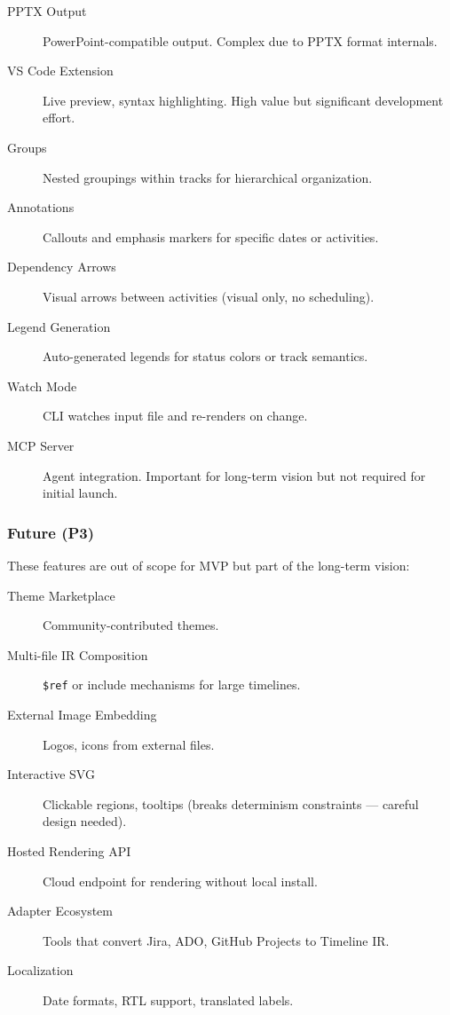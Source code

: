 \begin{description}
  \item[PPTX Output] PowerPoint-compatible output. Complex due to PPTX format internals.
  
  \item[VS Code Extension] Live preview, syntax highlighting. High value but significant development effort.
  
  \item[Groups] Nested groupings within tracks for hierarchical organization.
  
  \item[Annotations] Callouts and emphasis markers for specific dates or activities.
  
  \item[Dependency Arrows] Visual arrows between activities (visual only, no scheduling).
  
  \item[Legend Generation] Auto-generated legends for status colors or track semantics.
  
  \item[Watch Mode] CLI watches input file and re-renders on change.
  
  \item[MCP Server] Agent integration. Important for long-term vision but not required for initial launch.
\end{description}

\subsubsection{Future (P3)}

These features are out of scope for MVP but part of the long-term vision:

\begin{description}
  \item[Theme Marketplace] Community-contributed themes.
  
  \item[Multi-file IR Composition] \texttt{\$ref} or include mechanisms for large timelines.
  
  \item[External Image Embedding] Logos, icons from external files.
  
  \item[Interactive SVG] Clickable regions, tooltips (breaks determinism constraints — careful design needed).
  
  \item[Hosted Rendering API] Cloud endpoint for rendering without local install.
  
  \item[Adapter Ecosystem] Tools that convert Jira, ADO, GitHub Projects to Timeline IR.
  
  \item[Localization] Date formats, RTL support, translated labels.
\end{description}

